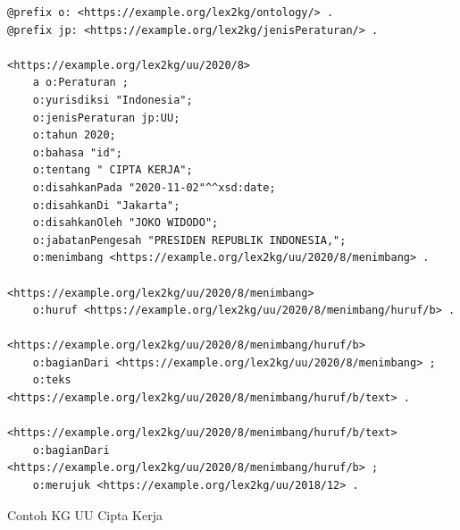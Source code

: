 \begin{listing}[H]
  \begin{verbatim}
@prefix o: <https://example.org/lex2kg/ontology/> .
@prefix jp: <https://example.org/lex2kg/jenisPeraturan/> .

<https://example.org/lex2kg/uu/2020/8>
    a o:Peraturan ;
    o:yurisdiksi "Indonesia";
    o:jenisPeraturan jp:UU;
    o:tahun 2020;
    o:bahasa "id";
    o:tentang " CIPTA KERJA";
    o:disahkanPada "2020-11-02"^^xsd:date;
    o:disahkanDi "Jakarta";
    o:disahkanOleh "JOKO WIDODO";
    o:jabatanPengesah "PRESIDEN REPUBLIK INDONESIA,";
    o:menimbang <https://example.org/lex2kg/uu/2020/8/menimbang> .

<https://example.org/lex2kg/uu/2020/8/menimbang> 
    o:huruf <https://example.org/lex2kg/uu/2020/8/menimbang/huruf/b> .

<https://example.org/lex2kg/uu/2020/8/menimbang/huruf/b> 
    o:bagianDari <https://example.org/lex2kg/uu/2020/8/menimbang> ;
    o:teks <https://example.org/lex2kg/uu/2020/8/menimbang/huruf/b/text> .

<https://example.org/lex2kg/uu/2020/8/menimbang/huruf/b/text> 
    o:bagianDari <https://example.org/lex2kg/uu/2020/8/menimbang/huruf/b> ;
    o:merujuk <https://example.org/lex2kg/uu/2018/12> .

  \end{verbatim}
  \caption{Contoh KG UU Cipta Kerja}
  \label{lst:res}
\end{listing}

